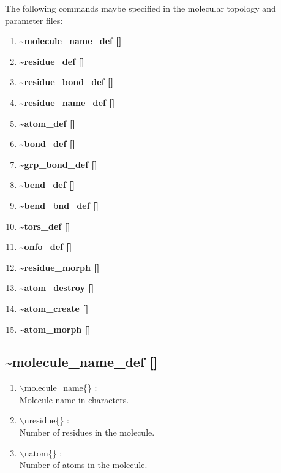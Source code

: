 \documentclass[12pt]{article}
\begin{document}
The following commands maybe specified in the molecular topology 
and parameter files:
\begin{enumerate}
\item {\bf \~{ }molecule\_name\_def []}
\item {\bf \~{ }residue\_def []}
\item {\bf \~{ }residue\_bond\_def []}
\item {\bf \~{ }residue\_name\_def []}
\item {\bf \~{ }atom\_def []} 
\item {\bf \~{ }bond\_def []}
\item {\bf \~{ }grp\_bond\_def []}
\item {\bf \~{ }bend\_def []}
\item {\bf \~{ }bend\_bnd\_def []}
\item {\bf \~{ }tors\_def []}
\item {\bf \~{ }onfo\_def   []}   
\item {\bf \~{ }residue\_morph []}
\item {\bf \~{ }atom\_destroy []}
\item {\bf \~{ }atom\_create []}
\item {\bf \~{ }atom\_morph []}
\end{enumerate}

\newpage
\subsection*{\bf \~{ }molecule\_name\_def []}

\begin{enumerate}

 \vspace{0.15in} 
 \item  $\backslash$molecule\_name\{\} : \\ 
    Molecule name in characters.

 \vspace{0.15in} 
 \item  $\backslash$nresidue\{\} : \\ 
    Number of residues in the molecule.

 \vspace{0.15in} 
 \item  $\backslash$natom\{\} : \\ 
    Number of atoms in the molecule.
\end{enumerate}
\end{document}
